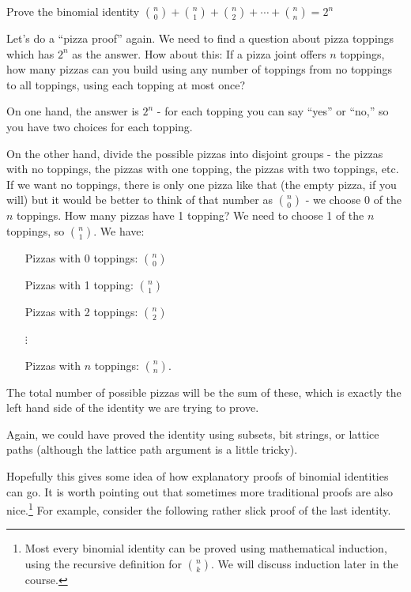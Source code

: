 \documentclass[12pt]{article}
\begin{document}
\begin{example}
  Prove the binomial identity ${n\choose 0} + {n \choose 1} + {n\choose 2} + \cdots + {n \choose n} = 2^n$
  \begin{solution}
    Let's do a ``pizza proof'' again.  We need to find a question about pizza toppings which has $2^n$ as the answer.  How about this: If a pizza joint offers $n$ toppings, how many pizzas can you build using any number of toppings from no toppings to all toppings, using each topping at most once?
    
    On one hand, the answer is $2^n$ - for each topping you can say ``yes'' or ``no,'' so you have two choices for each topping.
    
    On the other hand, divide the possible pizzas into disjoint groups - the pizzas with no toppings, the pizzas with one topping, the pizzas with two toppings, etc.  If we want no toppings, there is only one pizza like that (the empty pizza, if you will) but it would be better to think of that number as ${n \choose 0}$ - we choose 0 of the $n$ toppings.  How many pizzas have 1 topping?  We need to choose 1 of the $n$ toppings, so ${n \choose 1}$.  We have:
    \begin{itemize}
      \item[] Pizzas with 0 toppings: ${n \choose 0}$
      \item[] Pizzas with 1 topping: ${n \choose 1}$
      \item[] Pizzas with 2 toppings: ${n \choose 2}$
      \item[$\vdots$] ~
      \item[] Pizzas with $n$ toppings: ${n \choose n}$.
    \end{itemize}
    The total number of possible pizzas will be the sum of these, which is exactly the left hand side of the identity we are trying to prove.  
    
    Again, we could have proved the identity using subsets, bit strings, or lattice paths (although the lattice path argument is a little tricky). 
  \end{solution}

\end{example}

Hopefully this gives some idea of how explanatory proofs of binomial identities can go.  It is worth pointing out that sometimes more traditional proofs are also nice.\footnote{Most every binomial identity can be proved using mathematical induction, using the recursive definition for ${n \choose k}$.  We will discuss induction later in the course.}  For example, consider the following rather slick proof of the last identity.
\end{document}

